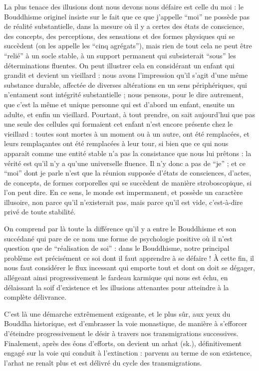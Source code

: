 La plus tenace des illusions dont nous devons nous défaire est celle du moi : le Bouddhisme originel insiste sur le fait que ce que j'appelle ``moi'' ne possède pas de réalité
substantielle, dans la mesure où il y a certes des états de conscience, des concepts, des
perceptions, des sensations et des formes physiques qui se succèdent (on les appelle les
``cinq agrégats''), mais rien de tout cela ne peut être ``relié'' à un socle stable, à un
support permanent qui subsisterait ``sous'' les déterminations fluentes.
On peut illustrer
cela en considérant un enfant qui grandit et devient un vieillard : nous avons
l'impression qu'il s'agit d'une même substance durable, affectée de diverses altérations
en un sens périphériques, qui n'entament sont intégrité substantielle ; nous pensons,
pour le dire autrement, que c'est la même et unique personne qui est d'abord un enfant,
ensuite un adulte, et enfin un vieillard.
Pourtant, à tout prendre, on sait aujourd'hui que
pas une seule des cellules qui formaient cet enfant n'est encore présente chez le vieillard : toutes sont mortes à un moment ou à un autre, ont été remplacées, et leurs
remplaçantes ont été remplacées à leur tour, si bien que ce qui nous apparaît comme une
entité stable n'a pas la consistance que nous lui prêtons : la vérité est qu'il n'y a qu'une
universelle fluence.
Il n'y donc a pas de ``je'' ; et ce ``moi'' dont je parle n'est que la
réunion supposée d'états de consciences, d'actes, de concepts, de formes corporelles qui
se succèdent de manière stroboscopique, si l'on peut dire.
En ce sens, le monde est impermanent, et possède un caractère illusoire, non parce qu'il n'existerait pas, mais parce
qu'il est vide, c'est-à-dire privé de toute stabilité.

On comprend par là toute la différence qu'il y a entre le Bouddhisme et son succédané
qui pare de ce nom une forme de psychologie positive où il n'est question que de ``réalisation de soi'' : dans le Bouddhisme, notre principal problème est précisément ce soi
dont il faut apprendre à se défaire ! À cette fin, il nous faut considérer le flux incessant
qui emporte tout et dont on doit se dégager, allégeant ainsi progressivement le fardeau
karmique qui nous est échu, en délaissant la soif d'existence et les illusions attenantes
pour atteindre à la complète délivrance.

C'est là une démarche extrêmement exigeante, et le plus sûr, aux yeux du Bouddha historique, est d'embrasser la voie monastique, de manière à s'efforcer d'éteindre
progressivement le désir à travers nos transmigrations successives.
Finalement, après
des éons d'efforts, on devient un arhat (sk.), définitivement engagé sur la voie qui
conduit à l'extinction : parvenu au terme de son existence, l'arhat ne renaît plus et est
délivré du cycle des transmigrations.

